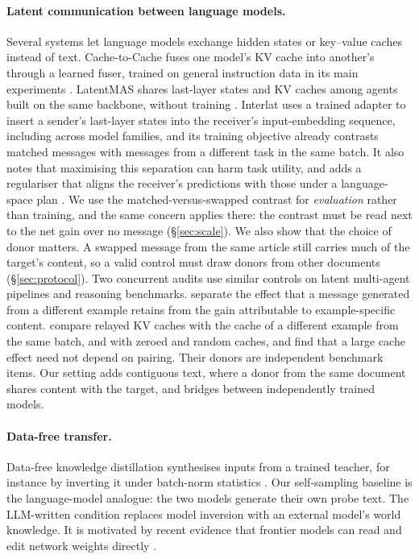 \paragraph{Latent communication between language models.}
Several systems let language models exchange hidden states or key--value caches instead of text. Cache-to-Cache fuses one model's KV cache into another's through a learned fuser, trained on general instruction data in its main experiments \citep{fu2026c2c}. LatentMAS shares last-layer states and KV caches among agents built on the same backbone, without training \citep{zou2025latentmas}. Interlat uses a trained adapter to insert a sender's last-layer states into the receiver's input-embedding sequence, including across model families, and its training objective already contrasts matched messages with messages from a different task in the same batch. It also notes that maximising this separation can harm task utility, and adds a regulariser that aligns the receiver's predictions with those under a language-space plan \citep{du2025interlat}. We use the matched-versus-swapped contrast for \emph{evaluation} rather than training, and the same concern applies there: the contrast must be read next to the net gain over no message (\S\ref{sec:scale}). We also show that the choice of donor matters. A swapped message from the same article still carries much of the target's content, so a valid control must draw donors from other documents (\S\ref{sec:protocol}).
Two concurrent audits use similar controls on latent multi-agent pipelines and reasoning benchmarks. \citet{zhang2026latentchannelsactuallycommunicate} separate the effect that a message generated from a different example retains from the gain attributable to example-specific content. \citet{cheng2026doeslatentcommunicationpay} compare relayed KV caches with the cache of a different example from the same batch, and with zeroed and random caches, and find that a large cache effect need not depend on pairing. Their donors are independent benchmark items. Our setting adds contiguous text, where a donor from the same document shares content with the target, and bridges between independently trained models.

\paragraph{Data-free transfer.}
Data-free knowledge distillation synthesises inputs from a trained teacher, for instance by inverting it under batch-norm statistics \citep{yin2020deepinversion}. Our self-sampling baseline is the language-model analogue: the two models generate their own probe text. The LLM-written condition replaces model inversion with an external model's world knowledge. It is motivated by recent evidence that frontier models can read and edit network weights directly \citep{takehi2026sparks}.

